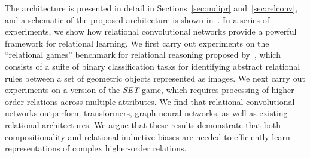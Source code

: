 The architecture is presented in detail in Sections~\ref{sec:mdipr} and~\ref{sec:relconv}, and a schematic of the proposed architecture is shown in~. In a series of experiments, we show how relational convolutional networks provide a powerful framework
for relational learning. We first carry out experiments on the ``relational games'' benchmark for relational reasoning proposed by~\citet{shanahanExplicitlyRelationalNeural}, which consists of a suite of binary classification tasks for identifying abstract relational rules between a set of geometric objects represented as images. 
We next carry out experiments on a version of the \textit{SET} game, which requires processing of higher-order relations across multiple attributes. We find that relational convolutional networks outperform transformers, graph neural networks, as well as existing relational architectures. We argue that these results demonstrate that both compositionality and relational inductive biases are needed to efficiently learn representations of complex higher-order relations.


